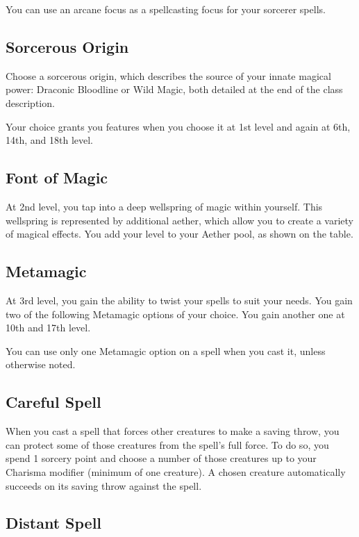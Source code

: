 You can use an arcane focus as a spellcasting focus for your sorcerer spells.

\subsection{Sorcerous Origin}

Choose a sorcerous origin, which describes the source of your innate magical power: Draconic Bloodline or Wild Magic, both detailed at the end of the class description.

Your choice grants you features when you choose it at 1st level and again at 6th, 14th, and 18th level.

\subsection{Font of Magic}

At 2nd level, you tap into a deep wellspring of magic within yourself. This wellspring is represented by additional aether, which allow you to create a variety of magical effects. You add your level to your Aether pool, as shown on the  table.

\subsection{Metamagic}

At 3rd level, you gain the ability to twist your spells to suit your needs. You gain two of the following Metamagic options of your choice. You gain another one at 10th and 17th level.

You can use only one Metamagic option on a spell when you cast it, unless otherwise noted.

\subsection{Careful Spell}

When you cast a spell that forces other creatures to make a saving throw, you can protect some of those creatures from the spell's full force. To do so, you spend 1 sorcery point and choose a number of those creatures up to your Charisma modifier (minimum of one creature). A chosen creature automatically succeeds on its saving throw against the spell.

\subsection{Distant Spell}

